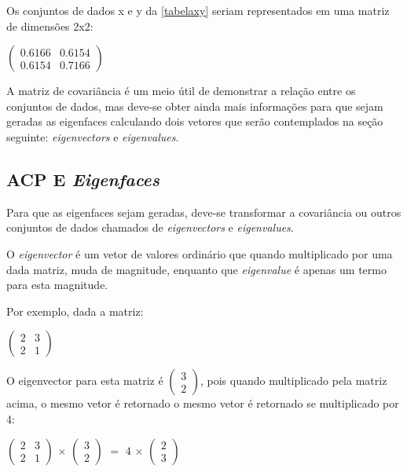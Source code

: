 Os conjuntos de dados x e y da \autoref{tabelaxy} seriam representados em uma matriz de dimensões 2x2:

\begin{center}
	$\begin{pmatrix} 0.6166 & 0.6154 \\ 0.6154 & 0.7166 \end{pmatrix}$
\end{center}


A matriz de covariância é um meio útil de demonstrar a relação entre os conjuntos de dados, mas deve-se obter ainda mais informações para que sejam geradas as eigenfaces calculando dois vetores que serão contemplados na seção seguinte: \textit{eigenvectors} e \textit{eigenvalues}.

\subsection{ACP E \textit{Eigenfaces}}\label{subsec:acp-eigen}

Para que as eigenfaces sejam geradas, deve-se transformar a covariância ou outros conjuntos de dados chamados de \textit{eigenvectors} e \textit{eigenvalues}.

O \textit{eigenvector} é um vetor de valores ordinário que quando multiplicado por uma dada matriz, muda de magnitude, enquanto que \textit{eigenvalue} é apenas um termo para esta magnitude. 

Por exemplo, dada a matriz:

\begin{center}
	$\begin{pmatrix} 2 & 3 \\ 2 & 1 \end{pmatrix}$
\end{center}

O eigenvector para esta matriz é $\begin{pmatrix} 3 \\ 2\end{pmatrix}$, pois quando multiplicado pela matriz acima, o mesmo vetor é retornado o mesmo vetor é retornado se multiplicado por 4:

\begin{center}
	$\begin{pmatrix} 2 & 3 \\ 2 & 1 \end{pmatrix}$ $\times$ $\begin{pmatrix} 3 \\ 2 \end{pmatrix}$ $=$ $4$ $\times$ $\begin{pmatrix} 2 \\ 3\end{pmatrix}$
\end{center}

